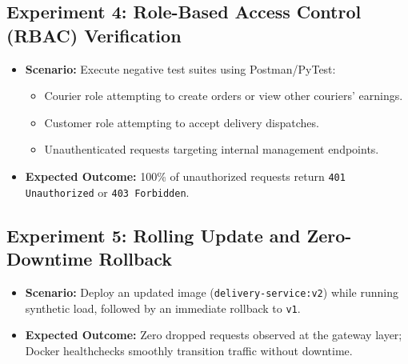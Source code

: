 \documentclass[11pt,a4paper]{article}
\begin{document}
\subsection{Experiment 4: Role-Based Access Control (RBAC) Verification}
\begin{itemize}[noitemsep]
    \item \textbf{Scenario:} Execute negative test suites using Postman/PyTest:
    \begin{itemize}[noitemsep]
        \item Courier role attempting to create orders or view other couriers' earnings.
        \item Customer role attempting to accept delivery dispatches.
        \item Unauthenticated requests targeting internal management endpoints.
    \end{itemize}
    \item \textbf{Expected Outcome:} 100\% of unauthorized requests return \texttt{401 Unauthorized} or \texttt{403 Forbidden}.
\end{itemize}

\subsection{Experiment 5: Rolling Update and Zero-Downtime Rollback}
\begin{itemize}[noitemsep]
    \item \textbf{Scenario:} Deploy an updated image (\texttt{delivery-service:v2}) while running synthetic load, followed by an immediate rollback to \texttt{v1}.
    \item \textbf{Expected Outcome:} Zero dropped requests observed at the gateway layer; Docker healthchecks smoothly transition traffic without downtime.
\end{itemize}
\end{document}
